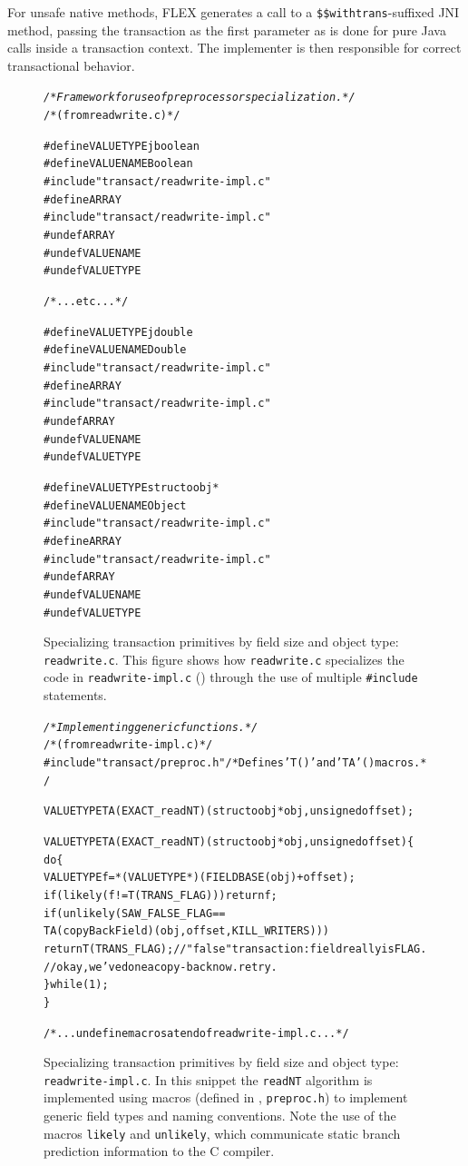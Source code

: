 For unsafe native methods, FLEX generates a call to a
\texttt{\$\$withtrans}-suffixed JNI method, passing the transaction as
the first parameter as is done for pure Java calls inside a
transaction context.  The implementer is then responsible for correct
transactional behavior.

\begin{figure}\sis\fontsize{8}{9}\begin{alltt}
\textit{/* Framework for use of preprocessor specialization. */}
/* (from readwrite.c) */

#define VALUETYPE jboolean
#define VALUENAME Boolean
#include "transact/readwrite-impl.c"
#define ARRAY
#include "transact/readwrite-impl.c"
#undef ARRAY
#undef VALUENAME
#undef VALUETYPE

/* ... etc ... */

#define VALUETYPE jdouble
#define VALUENAME Double
#include "transact/readwrite-impl.c"
#define ARRAY
#include "transact/readwrite-impl.c"
#undef ARRAY
#undef VALUENAME
#undef VALUETYPE

#define VALUETYPE struct oobj *
#define VALUENAME Object
#include "transact/readwrite-impl.c"
#define ARRAY
#include "transact/readwrite-impl.c"
#undef ARRAY
#undef VALUENAME
#undef VALUETYPE
\end{alltt}
\caption[Specializing transaction primitives by field size and object
  type (\texttt{readwrite.c}).]{
Specializing transaction primitives by field size and object type:
  \texttt{readwrite.c}.
This figure shows how \texttt{readwrite.c} specializes the code in
\texttt{readwrite-impl.c} () through the use of multiple 
\texttt{\#include} statements.}
\label{fig:special1}
\end{figure}
\begin{figure}\sis\fontsize{8}{9}\begin{alltt}
\textit{/* Implementing generic functions. */}
/* (from readwrite-impl.c) */
#include "transact/preproc.h" /* Defines 'T()' and 'TA'() macros. */

VALUETYPE TA(EXACT_readNT)(struct oobj *obj, unsigned offset);

VALUETYPE TA(EXACT_readNT)(struct oobj *obj, unsigned offset) \{
  do \{
    VALUETYPE f = *(VALUETYPE*)(FIELDBASE(obj) + offset);
    if (likely(f!=T(TRANS_FLAG))) return f;
    if (unlikely(SAW_FALSE_FLAG ==
                 TA(copyBackField)(obj, offset, KILL_WRITERS)))
      return T(TRANS_FLAG); // "false" transaction: field really is FLAG.
    // okay, we've done a copy-back now.  retry.
  \} while(1);
\}

/* ... undefine macros at end of readwrite-impl.c ... */\end{alltt}
\caption[Specializing transaction primitives by field size and object
 type (\texttt{readwrite-impl.c}).]{
Specializing transaction primitives by field size and object type:
 \texttt{readwrite-impl.c}.  In this snippet the \texttt{readNT} algorithm is
 implemented using macros (defined in ,
 \texttt{preproc.h}) to implement generic field types and naming
 conventions.  Note the use of the macros \texttt{likely} and
 \texttt{unlikely}, which communicate static branch
 prediction information to the C compiler.}
\label{fig:special2}
\end{figure}
